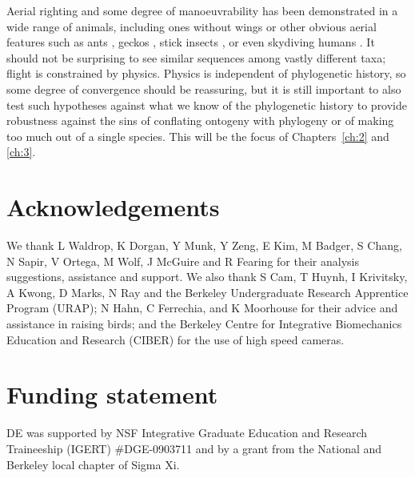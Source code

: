\documentclass[10pt]{article}
\begin{document}
Aerial righting and some degree of manoeuvrability has been demonstrated in a wide range of animals, including ones without wings or other obvious aerial features such as ants \citep{Munk:2011}, geckos \citep{Jusufi:2008, Jusufi:2010}, stick insects \citep{Jusufi:2011, Zeng:2013}, or even skydiving humans \citep{Cardona:2011, Evangelista:2012}.  It should not be surprising to see similar sequences among vastly different taxa; flight is constrained by physics. Physics is independent of phylogenetic history, so some degree of convergence should be reassuring, but it is still important to also test such hypotheses against what we know of the phylogenetic history to provide robustness against the sins of conflating ontogeny with phylogeny or of making too much out of a single species.  This will be the focus of Chapters~\ref{ch:2} and \ref{ch:3}.






\section*{Acknowledgements}
We thank L Waldrop, K Dorgan, Y Munk, Y Zeng, E Kim, M Badger, S Chang, N Sapir, V Ortega, M Wolf, J McGuire and R Fearing for their analysis suggestions, assistance and support.  We also thank S Cam, T Huynh, I Krivitsky, A Kwong, D Marks, N Ray and the Berkeley Undergraduate Research Apprentice Program (URAP); N Hahn, C Ferrechia, and K Moorhouse for their advice and assistance in raising birds; and the Berkeley Centre for Integrative Biomechanics Education and Research (CIBER) for the use of high speed cameras.  

\section*{Funding statement}
DE was supported by NSF Integrative Graduate Education and Research Traineeship (IGERT) \#DGE-0903711 and by a grant from the National and Berkeley local chapter of Sigma Xi.


\end{document}
